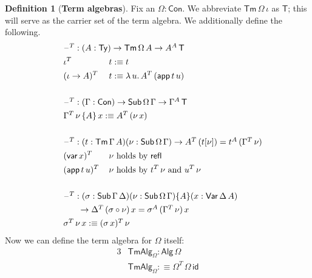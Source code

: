 \documentclass[12pt,a4paper,twoside,openany]{book}
\theoremstyle{remark}
\theoremstyle{definition}
\newtheorem{mydefinition}{Definition}
\theoremstyle{theorem}
\newcommand{\ms}[1]{\mathsf{#1}}
\newcommand{\refl}{\mathsf{refl}}
\newcommand{\id}{\mathsf{id}}
\newcommand{\Con}{\mathsf{Con}}
\newcommand{\Sub}{\mathsf{Sub}}
\newcommand{\Tm}{\mathsf{Tm}}
\newcommand{\Ty}{\mathsf{Ty}}
\newcommand{\blank}{\mathord{\hspace{1pt}\text{--}\hspace{1pt}}}
\newcommand{\Var}{\ms{Var}}
\newcommand{\var}{\ms{var}}
\newcommand{\app}{\ms{app}}
\newcommand{\Alg}{\ms{Alg}}
\newcommand{\TmAlg}{\ms{TmAlg}}
\newcommand{\defn}{:\equiv}
\begin{document}
\begin{mydefinition}[\textbf{Term algebras}]
Fix an $\Omega : \Con$. We abbreviate $\Tm\,\Omega\,\iota$ as $\ms{T}$; this will serve
as the carrier set of the term algebra. We additionally define the following.
\begin{alignat*}{3}
  & \hspace{-5em}\rlap{$\blank^T : (A : \Ty) \to \Tm\,\Omega\,A \to A^A\,\ms{T}$} \\
  & \hspace{-5em}\iota^T\,&&t \defn t \\
  & \hspace{-5em}(\iota\to A)^T\,&&t \defn \lambda\,u.\,A^T\,(\app\,t\,u)\\
  & \hspace{-5em}&& \\
  & \hspace{-5em}\rlap{$\blank^T : (\Gamma : \Con) \to \Sub\,\Omega\,\Gamma \to \Gamma^A\,\ms{T}$}\\
  & \hspace{-5em}\rlap{$\Gamma^T\,\nu\,\{A\}\,x \defn A^T\,(\nu\,x)$}\\
  & \hspace{-5em}&& \\
  & \hspace{-5em}\rlap{$\blank^T : (t : \Tm\,\Gamma\,A)(\nu : \Sub\,\Omega\,\Gamma) \to A^T\,(t[\nu]) = t^A\,(\Gamma^T\,\nu)$}\\
  & \hspace{-5em}(\var\,x)^T\,   &&\nu    \text{   holds by   } \refl\\
  & \hspace{-5em}(\app\,t\,u)^T\,&&\nu \text {   holds by   } t^T\,\nu \text{   and   } u^T\,\nu\\
  & \hspace{-5em}&& \\
  & \hspace{-5em}\rlap{$\blank^T : (\sigma : \Sub\,\Gamma\,\Delta)(\nu : \Sub\,\Omega\,\Gamma)\{A\}(x : \Var\,\Delta\,A)$}\\
  & \hspace{-3em}\rlap{$\to \Delta^T\,(\sigma \circ \nu)\,x = \sigma^A\,(\Gamma^T\,\nu)\,x$}\\
  & \hspace{-5em}\rlap{$ \sigma^T\,\nu\,x \defn (\sigma\,x)^T\,\nu$}
\end{alignat*}
Now we can define the term algebra for $\Omega$ itself:
\begin{alignat*}{3}
  & \TmAlg_{\Omega} : \Alg\,\Omega \\
  & \TmAlg_{\Omega} \defn \Omega^T\,\Omega\,\id
\end{alignat*}
\end{mydefinition}
\endgroup
\end{document}
